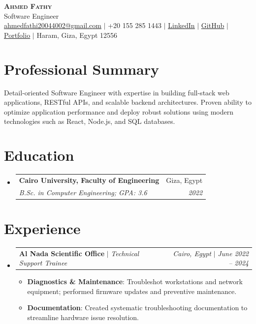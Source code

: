 \documentclass[letterpaper,11pt]{article}
\makeatletter
\newcommand{\resumeItem}[2]{\item\small{\textbf{#1}{: #2 \vspace{-2pt}}}}
\newcommand{\resumeSubheading}[4]{
  \vspace{-1pt}\item
    \begin{tabular*}{0.97\textwidth}{l@{\extracolsep{\fill}}r}
      \textbf{#1} & #2 \\
      \textit{\small#3} & \textit{\small #4} \\
    \end{tabular*}\vspace{-5pt}
}
\newcommand{\resumeActivitySubheading}[4]{
  \vspace{-1pt}\item
    \begin{tabular*}{0.97\textwidth}{l@{\extracolsep{\fill}}r}
      \textbf{#1} $|$ \textit{\small#3} & \textit{\small#2} $|$ \textit{\small #4} \\
    \end{tabular*}\vspace{-5pt}
}
\newcommand{\resumeSubHeadingListStart}{\begin{itemize}[leftmargin=*]}
\newcommand{\resumeSubHeadingListEnd}{\end{itemize}}
\newcommand{\resumeItemListStart}{\begin{itemize}}
\newcommand{\resumeItemListEnd}{\end{itemize}\vspace{-5pt}}
\makeatother
\begin{document}
\begin{center}
    \textbf{\Huge \scshape Ahmed Fathy} \\ \vspace{1pt}
    \small Software Engineer \\
    \href{mailto:ahmedfathi20044002@gmail.com}{\underline{ahmedfathi20044002@gmail.com}} $|$
    +20 155 285 1443 $|$
    \href{https://www.linkedin.com/in/ahmedfathy-x1}{\underline{LinkedIn}} $|$
    \href{https://github.com/ahmedfathy0-0}{\underline{GitHub}} $|$
    \href{https://www.mrfathi.tech/}{\underline{Portfolio}} $|$
    Haram, Giza, Egypt 12556
\end{center}


\section{Professional Summary}
  \small Detail-oriented Software Engineer with expertise in building full-stack web applications, RESTful APIs, and scalable backend architectures. Proven ability to optimize application performance and deploy robust solutions using modern technologies such as React, Node.js, and SQL databases.
  \vspace{8pt}
\section{Education}
  \resumeSubHeadingListStart
    \resumeSubheading
      {Cairo University, Faculty of Engineering}{Giza, Egypt}
      {B.Sc. in Computer Engineering;  GPA: 3.6}{2022}
  \resumeSubHeadingListEnd
\section{Experience}
  \resumeSubHeadingListStart
    \resumeActivitySubheading
      {Al Nada Scientific Office}{Cairo, Egypt}{Technical Support Trainee}{June 2022 -- 2024}
      \resumeItemListStart
        \resumeItem{Diagnostics \& Maintenance}
          {Troubleshot workstations and network equipment; performed firmware updates and preventive maintenance.}
        \resumeItem{Documentation}
          {Created systematic troubleshooting documentation to streamline hardware issue resolution.}
      \resumeItemListEnd
  \resumeSubHeadingListEnd
\end{document}
